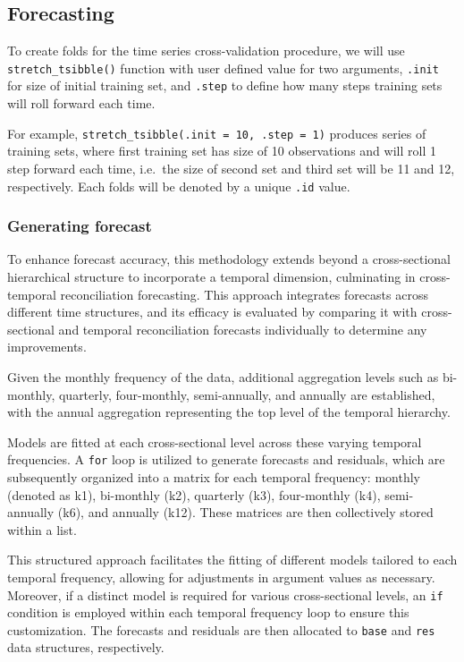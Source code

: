 \documentclass[11pt,a4paper,]{article}
\begin{document}
\subsection{Forecasting}\label{forecasting}

To create folds for the time series cross-validation procedure, we will use \texttt{stretch\_tsibble()} function with user defined value for two arguments, \texttt{.init} for size of initial training set, and \texttt{.step} to define how many steps training sets will roll forward each time.

For example, \texttt{stretch\_tsibble(.init\ =\ 10,\ .step\ =\ 1)} produces series of training sets, where first training set has size of 10 observations and will roll 1 step forward each time, i.e.~the size of second set and third set will be 11 and 12, respectively. Each folds will be denoted by a unique \texttt{.id} value.

\subsubsection{Generating forecast}\label{generating-forecast}

To enhance forecast accuracy, this methodology extends beyond a cross-sectional hierarchical structure to incorporate a temporal dimension, culminating in cross-temporal reconciliation forecasting. This approach integrates forecasts across different time structures, and its efficacy is evaluated by comparing it with cross-sectional and temporal reconciliation forecasts individually to determine any improvements.

Given the monthly frequency of the data, additional aggregation levels such as bi-monthly, quarterly, four-monthly, semi-annually, and annually are established, with the annual aggregation representing the top level of the temporal hierarchy.

Models are fitted at each cross-sectional level across these varying temporal frequencies. A \texttt{for} loop is utilized to generate forecasts and residuals, which are subsequently organized into a matrix for each temporal frequency: monthly (denoted as k1), bi-monthly (k2), quarterly (k3), four-monthly (k4), semi-annually (k6), and annually (k12). These matrices are then collectively stored within a list.

This structured approach facilitates the fitting of different models tailored to each temporal frequency, allowing for adjustments in argument values as necessary. Moreover, if a distinct model is required for various cross-sectional levels, an \texttt{if} condition is employed within each temporal frequency loop to ensure this customization. The forecasts and residuals are then allocated to \texttt{base} and \texttt{res} data structures, respectively.
\end{document}
